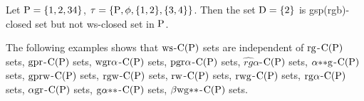 \begin{exm}\label{exam2.2.13}
Let $\mathrm{P} = \{1, 2, 3 4\}$, $\tau = \{\mathrm{P}, \phi, \{1, 2\}, \{3, 4\}\}$. Then the set $\mathrm{D}= \{2\}$ is gsp(rgb)-closed set but not ws-closed set in $\mathrm{P}$.
\end{exm}

\begin{rem}\label{rem2.2.14}
The following examples shows that $\mathrm{ws}$-$\mathrm{C}(\mathrm{P})$ sets are independent of $\mathrm{rg}$-$\mathrm{C}(\mathrm{P})$ sets, $\mathrm{gpr}$-$\mathrm{C}(\mathrm{P})$ sets, $\mathrm{wgr}\alpha$-$\mathrm{C}(\mathrm{P})$ sets, $\mathrm{pgr}\alpha$-$\mathrm{C}(\mathrm{P})$ sets, $\widehat{rg}\alpha$-$\mathrm{C}(\mathrm{P})$ sets, $\alpha{*}{*}\mathrm{g}$-$\mathrm{C}(\mathrm{P})$ sets, $\mathrm{gprw}$-$\mathrm{C}(\mathrm{P})$ sets, $\mathrm{rgw}$-$\mathrm{C}(\mathrm{P})$ sets, $\mathrm{rw}$-$\mathrm{C}(\mathrm{P})$ sets, $\mathrm{rwg}$-$\mathrm{C}(\mathrm{P})$ sets, $\mathrm{rg}\alpha$-$\mathrm{C}(\mathrm{P})$ sets, $\alpha\mathrm{gr}$-$\mathrm{C}(\mathrm{P})$ sets, $\mathrm{g}\alpha {*}{*}$-$\mathrm{C}(\mathrm{P})$ sets, $\beta \mathrm{wg}{*}{*}$-$\mathrm{C}(\mathrm{P})$ sets.
\end{rem}

